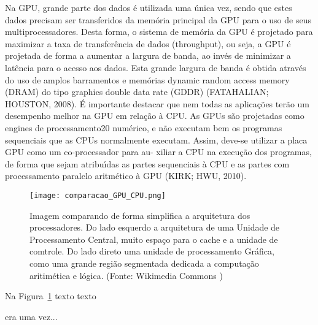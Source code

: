 Na GPU, grande parte dos dados é utilizada uma única vez, sendo que estes
dados precisam ser transferidos da memória principal da GPU para o uso de seus
multiprocessadores. Desta forma, o sistema de memória da GPU é projetado para
maximizar a taxa de transferência de dados (throughput), ou seja, a GPU é projetada
de forma a aumentar a largura de banda, ao invés de minimizar a latência para o
acesso aos dados. Esta grande largura de banda é obtida através do uso de amplos
barramentos e memórias dynamic random access memory (DRAM) do tipo graphics
double data rate (GDDR) (FATAHALIAN; HOUSTON, 2008).
É importante destacar que nem todas as aplicações terão um desempenho melhor
na GPU em relação à CPU. As GPUs são projetadas como engines de processamento20
numérico, e não executam bem os programas sequenciais que as CPUs normalmente
executam. Assim, deve-se utilizar a placa GPU como um co-processador para au-
xiliar a CPU na execução dos programas, de forma que sejam atribuı́das as partes
sequenciais à CPU e as partes com processamento paralelo aritmético à GPU (KIRK;
HWU, 2010).

  \begin{figure}[!h]
    \centering
    \texttt{[image: comparacao\_GPU\_CPU.png]}
    \caption{Imagem comparando de forma simplifica a arquitetura dos processadores. Do lado esquerdo a arquitetura de uma Unidade de Processamento Central, muito espaço para o cache e a unidade de comtrole. Do lado direto uma unidade de processamento Gráfica, como uma grande região segmentada dedicada a computação aritimética e lógica. (Fonte: Wikimedia Commons \protect\footnotemark)}
    \label{fig:cpuvsgpu}
  \end{figure}



  Na Figura~\ref{fig:cpuvsgpu} texto texto

  era uma vez...


